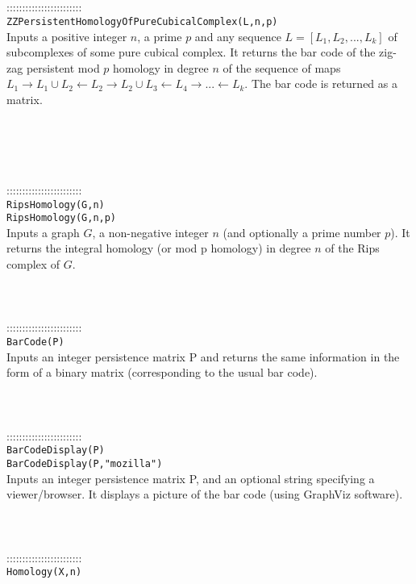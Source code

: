 \documentclass[a4paper,11pt]{report}
\begin{document}
{ \\
 \\
 \\
 \\
 ::::::::::::::::::::::::\\
 \texttt{ZZPersistentHomologyOfPureCubicalComplex(L,n,p)}\\
 

 Inputs a positive integer $n$, a prime $p$ and any sequence $L=[L_1, L_2, ..., L_k]$ of subcomplexes of some pure cubical complex. It returns the bar code of the
zig-zag persistent mod $p$ homology in degree $n$ of the sequence of maps $L_1 \rightarrow L_1 \cup L_2 \leftarrow L_2 \rightarrow L_2 \cup L_3
\leftarrow L_4 \rightarrow ... \leftarrow L_k$. The bar code is returned as a matrix. 

 \\
 \\
 \\
 \\
 ::::::::::::::::::::::::\\
 \texttt{RipsHomology(G,n)}\\
 \texttt{RipsHomology(G,n,p)}\\
 

 Inputs a graph $G$, a non-negative integer $n$ (and optionally a prime number $p$). It returns the integral homology (or mod p homology) in degree $n$ of the Rips complex of $G$. \\
 \\
 \\
 \\
 ::::::::::::::::::::::::\\
 \texttt{BarCode(P)}\\
 

 Inputs an integer persistence matrix P and returns the same information in the
form of a binary matrix (corresponding to the usual bar code). \\
 \\
 \\
 \\
 ::::::::::::::::::::::::\\
 \texttt{BarCodeDisplay(P)}\\
 \texttt{BarCodeDisplay(P,"mozilla")}\\
 

 Inputs an integer persistence matrix P, and an optional string specifying a
viewer/browser. It displays a picture of the bar code (using GraphViz
software). \\
 \\
 \\
 \\
 ::::::::::::::::::::::::\\
 \texttt{Homology(X,n)}\\
 

}
\end{document}
